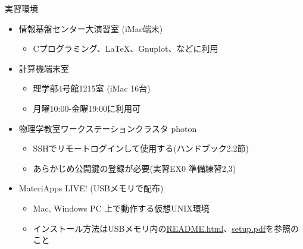 \begin{frame}[t,fragile]{実習環境}
  \begin{itemize}
    \setlength{\itemsep}{1em}
  \item 情報基盤センター大演習室 (iMac端末)
    \begin{itemize}
    \item Cプログラミング、\LaTeX、Gnuplot、などに利用
    \end{itemize}
  \item 計算機端末室
    \begin{itemize}
    \item 理学部4号館1215室 (iMac 16台)
    \item 月曜10:00-金曜19:00に利用可
    \end{itemize}
  \item 物理学教室ワークステーションクラスタ photon
    \begin{itemize}
    \item SSHでリモートログインして使用する(ハンドブック2.2節)
    \item あらかじめ公開鍵の登録が必要(実習EX0 準備練習2,3)
    \end{itemize}
  \item MateriApps LIVE! (USBメモリで配布)
    \begin{itemize}
    \item Mac, Windows PC 上で動作する仮想UNIX環境
  \item インストール方法はUSBメモリ内の\href{https://github.com/cmsi/MateriAppsLive/wiki/MateriAppsLive-ltx}{README.html}、\href{https://github.com/cmsi/MateriAppsLive-setup/blob/master/ova/setup.pdf}{setup.pdf}を参照のこと
    \end{itemize}
  \end{itemize}
\end{frame}
